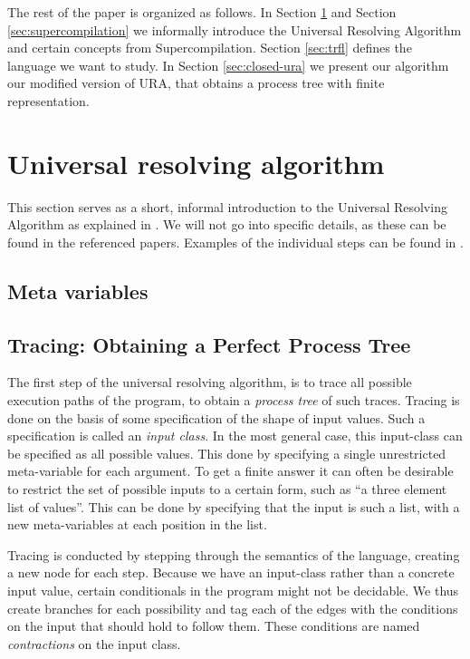 \documentclass[10pt]{../sigplanconf}
\begin{document}
The rest of the paper is organized as follows. In Section
\ref{sec:ura} and Section \ref{sec:supercompilation} we informally
introduce the Universal Resolving Algorithm and certain concepts from
Supercompilation. Section \ref{sec:trfl} defines the language we
want to study. In Section \ref{sec:closed-ura} we present our
algorithm our modified version of URA, that obtains a process tree
with finite representation.


\section{Universal resolving algorithm}
\label{sec:ura}
This section serves as a short, informal introduction to the Universal
Resolving Algorithm as explained in \cite{abramov2000universal,
  abramov2002universal, abramov2002principles}. We will not go into
specific details, as these can be found in the referenced
papers. Examples of the individual steps can be found in
\cite{abramov2000universal}.

\subsection{Meta variables}

\subsection{Tracing: Obtaining a Perfect Process Tree}
The first step of the universal resolving algorithm, is to trace all
possible execution paths of the program, to obtain a \textit{process
  tree} of such traces. Tracing is done on the basis of some
specification of the shape of input values. Such a specification is
called an \textit{input class}. In the most general case, this
input-class can be specified as all possible values. This done by
specifying a single unrestricted meta-variable for each argument. To
get a finite answer it can often be desirable to restrict the set of
possible inputs to a certain form, such as ``a three element list of
values''. This can be done by specifying that the input is such a
list, with a new meta-variables at each position in the list. 

Tracing is conducted by stepping through the semantics of the
language, creating a new node for each step. Because we have an
input-class rather than a concrete input value, certain conditionals
in the program might not be decidable. We thus create branches for
each possibility and tag each of the edges with the conditions on the
input that should hold to follow them. These conditions are named
\textit{contractions} on the input class.
\end{document}

